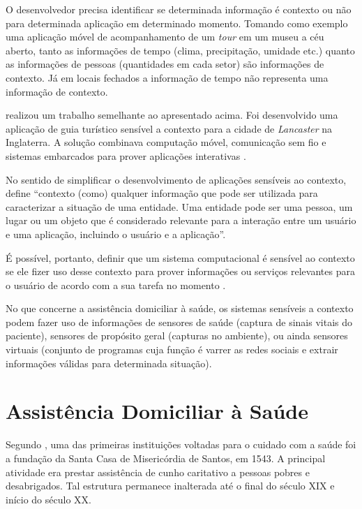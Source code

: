O desenvolvedor precisa identificar se determinada informação é contexto ou não
para determinada aplicação em determinado momento. Tomando como exemplo uma
aplicação móvel de acompanhamento de um \textit{tour} em um museu a céu aberto, 
tanto as informações de tempo (clima, precipitação, umidade etc.) quanto as 
informações de pessoas (quantidades em cada setor) são informações de contexto.
Já em locais fechados a informação de tempo não representa uma informação de 
contexto.

 realizou um trabalho semelhante ao apresentado
acima. Foi desenvolvido uma aplicação de guia turístico sensível a contexto
para a cidade de \textit{Lancaster} na Inglaterra. A solução combinava
computação móvel, comunicação sem fio e sistemas embarcados para prover
aplicações interativas \cite{davies1999caches}.

No sentido de simplificar o desenvolvimento de aplicações sensíveis ao
contexto,  define ``contexto (como) qualquer
informação que pode ser utilizada para caracterizar a situação de uma entidade.
Uma entidade pode ser uma pessoa, um lugar ou um objeto que é considerado
relevante para a interação entre um usuário e uma aplicação, incluindo o
usuário e a aplicação''.

É possível, portanto, definir que um sistema computacional é sensível ao contexto
se ele fizer uso desse contexto para prover informações ou serviços relevantes para
o usuário de acordo com a sua tarefa no momento \cite{dey2001understanding}.

No que concerne a assistência domiciliar à saúde, os sistemas sensíveis a
contexto podem fazer uso de informações de sensores de saúde (captura de sinais 
vitais do paciente), sensores de propósito geral (capturas no ambiente), 
ou ainda sensores virtuais (conjunto de programas cuja função é varrer as redes 
sociais e extrair informações válidas para determinada situação).

\section{Assistência Domiciliar à Saúde} \label{sec:ads}

Segundo , uma das primeiras instituições voltadas para o
cuidado com a saúde foi a fundação da Santa Casa de Misericórdia de Santos, em
1543. A principal atividade era prestar assistência de cunho caritativo a
pessoas pobres e desabrigados. Tal estrutura permanece inalterada até o final do
século XIX e início do século XX.

